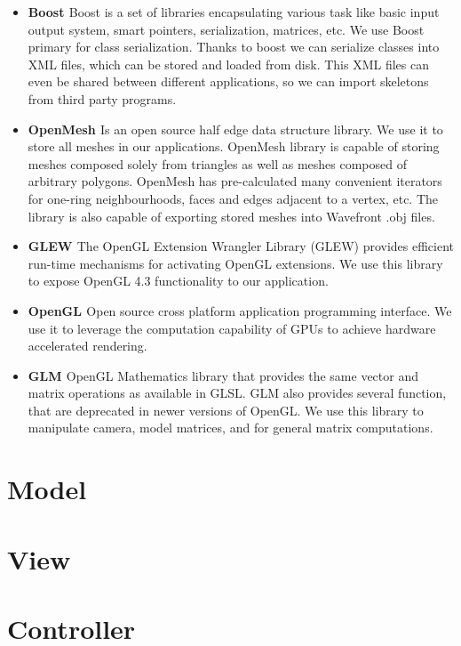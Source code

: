\begin{itemize}
	\item \textbf{Boost \cite{Boost}} Boost is a set of libraries encapsulating various task like basic input output system, smart pointers, serialization, matrices, etc. We use Boost primary for class serialization. Thanks to boost we can serialize classes into XML files, which can be stored and loaded from disk. This XML files can even be shared between different applications, so we can import skeletons from third party programs.
	\item \textbf{OpenMesh \cite{OpenMesh}} Is an open source half edge data structure library. We use it to store all meshes in our applications. OpenMesh library is capable of storing meshes composed solely from triangles as well as meshes composed of arbitrary polygons. OpenMesh has pre-calculated many convenient iterators for one-ring neighbourhoods, faces and edges adjacent to a vertex, etc. The library is also capable of exporting stored meshes into Wavefront .obj files.
	\item \textbf{GLEW \cite{glew}} The OpenGL Extension Wrangler Library (GLEW) provides efficient run-time mechanisms for activating OpenGL extensions. We use this library to expose OpenGL 4.3 functionality to our application.
	\item \textbf{OpenGL \cite{opengl}} Open source cross platform application programming interface. We use it to leverage the computation capability of GPUs to achieve hardware accelerated rendering.
	\item \textbf{GLM \cite{glm}} OpenGL Mathematics library that provides the same vector and matrix operations as available in GLSL. GLM also provides several function, that are deprecated in newer versions of OpenGL. We use this library to manipulate camera, model matrices, and for general matrix computations.
\end{itemize}

\section{Model}

\section{View}

\section{Controller}